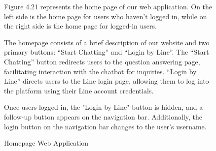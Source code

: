 \documentclass[12pt,oneside,openright,a4paper]{cpe-english-project}
\begin{document}
\begin{figure}[!h]
            \caption{Homepage Web Application}\label{fig:WebAppHomepage}
            \begin{flushleft}
              \qquad Figure 4.21 represents the home page of our web application. On the left side is the home page for users who  haven't logged in, while on the right side is the home page for logged-in users.\par
              \qquad The homepage consists of a brief description of our website and two primary buttons: “Start Chatting” and “Login by Line”.  The “Start Chatting” button redirects users to the question answering page, facilitating interaction with the chatbot for inquiries. “Login by Line” directs users to the Line login page, allowing them to log into the platform using their Line account credentials.\par
              \qquad Once users logged in, the  "Login by Line" button is hidden,  and a follow-up button appears on the navigation bar. Additionally, the login button on the navigation bar changes to the user's username.\par
            \end{flushleft}
          \end{figure}
\end{document}
